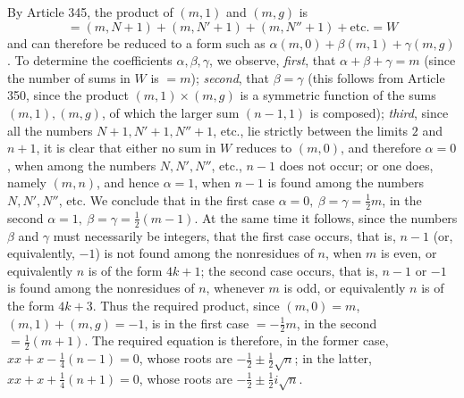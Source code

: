By Article 345, the product of \((m,1)\) and \((m,g)\) is \[=(m,N+1)+(m,N'+1)+(m,N''+1)+\text{etc.}=W\] and can therefore be reduced to a form such as \(\alpha(m,0)+\beta(m,1)+\gamma(m,g)\). To determine the coefficients \(\alpha,\allowbreak \beta,\allowbreak \gamma\), we observe, \textit{first}, that \(\alpha+\beta+\gamma=m\) (since the number of sums in \(W\) is \(=m\)); \textit{second}, that \(\beta=\gamma\) (this follows from Article 350, since the product \((m,1)\times(m,g)\) is a symmetric function of the sums \((m,1),\allowbreak (m,g)\), of which the larger sum \((n-1,1)\) is composed); \textit{third}, since all the numbers \(N+1,\allowbreak N'+1,\allowbreak N''+1\), etc., lie strictly between the limits \(2\) and \(n+1\), it is clear that either no sum in \(W\) reduces to \((m,0)\), and therefore \(\alpha=0\), when among the numbers \(N,\allowbreak N',\allowbreak N''\), etc., \(n-1\) does not occur; or one does, namely \((m,n)\), and hence \(\alpha=1\), when \(n-1\) is found among the numbers \(N,\allowbreak N',\allowbreak N''\), etc. We conclude that in the first case \(\alpha=0,\allowbreak \ \beta=\gamma=\frac12m\), in the second \(\alpha=1,\allowbreak \ \beta=\gamma=\frac12(m-1)\). At the same time it follows, since the numbers \(\beta\) and \(\gamma\) must necessarily be integers, that the first case occurs, that is, \(n-1\) (or, equivalently, \(-1\)) is not found among the nonresidues of \(n\), when \(m\) is even, or equivalently \(n\) is of the form \(4k+1\); the second case occurs, that is, \(n-1\) or \(-1\) is found among the nonresidues of \(n\), whenever \(m\) is odd, or equivalently \(n\) is of the form \(4k+3\). Thus the required product, since \((m,0)=m\), \((m,1)+(m,g)=-1\), is in the first case \(=-\frac12m\), in the second \(=\frac12(m+1)\). The required equation is therefore, in the former case, \(xx+x-\frac14(n-1)=0\), whose roots are \(-\frac12\pm\frac12\surd n\); in the latter, \(xx+x+\frac14(n+1)=0\), whose roots are \(-\frac12\pm\frac12i\surd n\).

